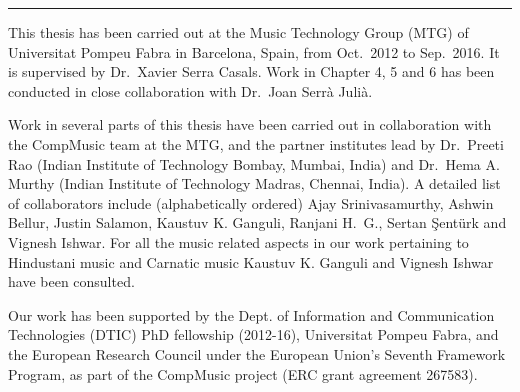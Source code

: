 
\vspace*{\fill}


\begin{center}
	\rule{0.3\textwidth}{.4pt}
\end{center}

This thesis has been carried out at the Music Technology Group (MTG) of Universitat Pompeu Fabra in Barcelona, Spain, from Oct.~2012 to Sep.~2016.
It is supervised by Dr.~Xavier Serra Casals. Work in Chapter 4, 5 and 6 has been conducted in close collaboration with Dr.~Joan Serrà Julià. 

Work in several parts of this thesis have been carried out in collaboration with the CompMusic team at the MTG, and the partner institutes lead by Dr.~Preeti Rao (Indian Institute of Technology Bombay, Mumbai, India) and Dr.~Hema A. Murthy (Indian Institute of Technology Madras, Chennai, India). A detailed list of collaborators include (alphabetically ordered) Ajay Srinivasamurthy, Ashwin Bellur, Justin Salamon, Kaustuv K. Ganguli, Ranjani H.~G., Sertan Şentürk and Vignesh Ishwar. For all the music related aspects in our work pertaining to Hindustani music and Carnatic music Kaustuv K. Ganguli and Vignesh Ishwar have been consulted. 

Our work has been supported by the Dept. of Information and Communication Technologies (DTIC) PhD fellowship (2012-16), Universitat Pompeu Fabra, and the European Research Council under the European Union’s Seventh Framework Program, as part of the CompMusic project (ERC grant agreement 267583).
